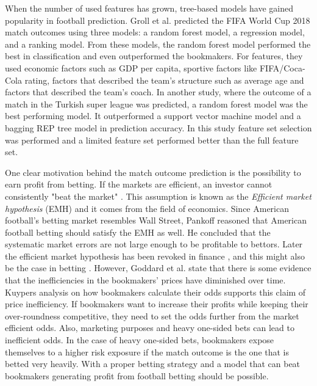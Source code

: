 When the number of used features has grown, tree-based models have gained popularity in football prediction. Groll et al.\cite{groll2018prediction} predicted the FIFA World Cup 2018 match outcomes using three models: a random forest model, a regression model, and a ranking model. From these models, the random forest model performed the best in classification and even outperformed the bookmakers. For features, they used economic factors such as GDP per capita, sportive factors like FIFA/Coca-Cola rating, factors that described the team's structure such as average age and factors that described the team's coach. In another study, where the outcome of a match in the Turkish super league was predicted, a random forest model was the best performing model. It outperformed a support vector machine model and a bagging REP tree model in prediction accuracy. In this study feature set selection was performed and a limited feature set performed better than the full feature set. \cite{10.1007/978-3-319-29504-6_48}

One clear motivation behind the match outcome prediction is the possibility to earn profit from betting. If the markets are efficient, an investor cannot consistently "beat the market" \cite{badarinathi1996football}. This assumption is known as the \textit{Efficient market hypothesis} (EMH) and it comes from the field of economics. Since American football's betting market resembles Wall Street, Pankoff \cite{pankoff1968market} reasoned that American football betting should satisfy the EMH as well. He concluded that the systematic market errors are not large enough to be profitable to bettors. Later the efficient market hypothesis has been revoked in finance \cite{jegadeesh1993returns}, and this might also be the case in betting \cite{goddard2003modelling, badarinathi1996football}. However, Goddard et al. \cite{goddard2003modelling} state that there is some evidence that the inefficiencies in the bookmakers’ prices have diminished over time. Kuypers \cite{kuypers2008} analysis on how bookmakers calculate their odds supports this claim of price inefficiency. If bookmakers want to increase their profits while keeping their over-roundness competitive, they need to set the odds further from the market efficient odds. Also, marketing purposes and heavy one-sided bets can lead to inefficient odds. In the case of heavy one-sided bets, bookmakers expose themselves to a higher risk exposure if the match outcome is the one that is betted very heavily. With a proper betting strategy and a model that can beat bookmakers generating profit from football betting should be possible.

